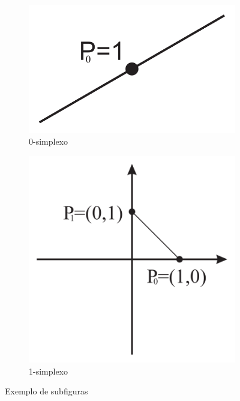 \documentclass[12pt,oneside]{book} %
\begin{document}
    \begin{figure}[h]
        \begin{center}
            \begin{subfigure}[b]{0.45\textwidth} %
                \centering
                \includegraphics[scale=0.25]{gr1.pdf}
                \caption{0-simplexo}
            \end{subfigure}
            \hspace{0.5cm}
            \begin{subfigure}[b]{0.45\textwidth}
                \centering
                \includegraphics[scale=0.25]{gr2.pdf}
                \caption{1-simplexo}
            \end{subfigure}
        \end{center}
        \caption{Exemplo de subfiguras}
    \end{figure}
\end{document}

